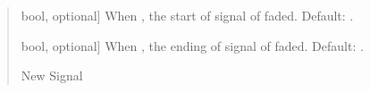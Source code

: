 \documentclass[letterpaper,10pt,english]{sphinxmanual}
\begin{document}
\begin{fulllineitems}
\begin{quote}
\begin{description}
\begin{description}
\sphinxlineitem{\sphinxstylestrong{at\_start}}{[}bool, optional{]}
\sphinxAtStartPar
When , the start of signal of faded. Default: .

\sphinxlineitem{\sphinxstylestrong{at\_end}}{[}bool, optional{]}
\sphinxAtStartPar
When , the ending of signal of faded. Default: .

\end{description}

\begin{description}
\sphinxlineitem{\sphinxstylestrong{new\_sig}}{[}\sphinxtitleref{Signal}{]}
\sphinxAtStartPar
New Signal

\end{description}

\end{description}\end{quote}

\end{fulllineitems}

\end{document}
